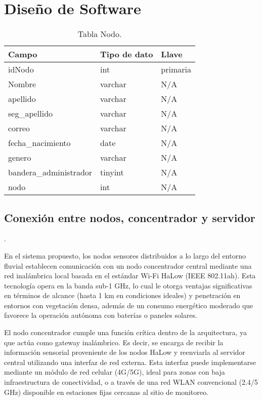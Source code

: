 \section{Diseño de Software}
\begin{table}[H]
\centering
\caption{Tabla Nodo.}
\label{tab:usuario}
\begin{tabular}{|l|l|l|}
\hline
\textbf{Campo}              & \textbf{Tipo de dato} & \textbf{Llave}   \\ \hline
idNodo                  & int                   & primaria         \\ \hline
Nombre                    & varchar               & N/A              \\ \hline
apellido                  & varchar               & N/A              \\ \hline
seg\_apellido             & varchar               & N/A              \\ \hline
correo                    & varchar               & N/A              \\ \hline
fecha\_nacimiento         & date                  & N/A              \\ \hline
genero                    & varchar               & N/A              \\ \hline
bandera\_administrador    & tinyint               & N/A              \\ \hline
nodo                      & int                   & N/A              \\ \hline
\end{tabular}
\end{table}

\subsection{Conexión entre nodos, concentrador y servidor}.

En el sistema propuesto, los nodos sensores distribuidos a lo largo del entorno fluvial establecen comunicación con un nodo concentrador central mediante una red inalámbrica local basada en el estándar Wi-Fi HaLow (IEEE 802.11ah). Esta tecnología opera en la banda sub-1 GHz, lo cual le otorga ventajas significativas en términos de alcance (hasta 1 km en condiciones ideales) y penetración en entornos con vegetación densa, además de un consumo energético moderado que favorece la operación autónoma con baterías o paneles solares.

El nodo concentrador cumple una función crítica dentro de la arquitectura, ya que actúa como gateway inalámbrico. Es decir, se encarga de recibir la información sensorial proveniente de los nodos HaLow y reenviarla al servidor central utilizando una interfaz de red externa. Esta interfaz puede implementarse mediante un módulo de red celular (4G/5G), ideal para zonas con baja infraestructura de conectividad, o a través de una red WLAN convencional (2.4/5 GHz) disponible en estaciones fijas cercanas al sitio de monitoreo.

